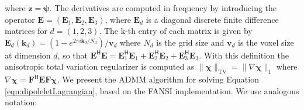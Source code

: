 \documentclass{article}
\begin{document}
where $\mathbf{z}=\bm{\psi}$. The derivatives are computed in frequency by introducing the operator $\mathbf{E}=(\mathbf{E}_{1},\mathbf{E}_{2},\mathbf{E}_{3})$, where $\mathbf{E}_{d}$ is a diagonal discrete finite difference matrices for $d=(1,2,3)$. The k-th entry of each matrix is given by $\mathbf{E}_{d}({\mathbf{k}_{d}})=(1-e^{2\pi i \mathbf{k}_{d}/N_{d}})/\mathbf{v}_{d}$ where $N_d$ is the grid size and $\mathbf{v}_{d}$ is the voxel size at dimension $d$, so that $\mathbf{E}^{\mathsf{H}}\mathbf{E} = \mathbf{E}_{1}^{\mathsf{H}}\mathbf{E}_{1}+\mathbf{E}_{2}^{\mathsf{H}}\mathbf{E}_{2}+\mathbf{E}_{3}^{\mathsf{H}}\mathbf{E}_{3}$. With this definition the anisotropic total variation regularizer is computed as $\|\bm{\chi}\|_{\text{TV}}= \|\nabla\bm{\chi}\|_{1}$ where $\nabla\bm{\chi}= \mathbf{F}^{\mathsf{H}}\mathbf{E}\mathbf{F}\bm{\chi}$. We present the ADMM algorithm for solving Equation \ref{eqn:dipoleletLagrangian}, based on the FANSI implementation. We use analogous notation:
 
\end{document}
